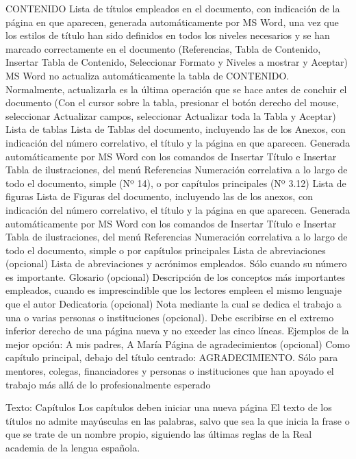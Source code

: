 CONTENIDO
Lista de títulos empleados en el documento, con indicación de la página en que aparecen,
generada automáticamente por MS Word, una vez que los estilos de título han sido definidos
en todos los niveles necesarios y se han marcado correctamente en el documento
(Referencias, Tabla de Contenido, Insertar Tabla de Contenido, Seleccionar Formato y
Niveles a mostrar y Aceptar)
MS Word no actualiza automáticamente la tabla de CONTENIDO. Normalmente,
actualizarla es la última operación que se hace antes de concluir el documento (Con el cursor
sobre la tabla, presionar el botón derecho del mouse, seleccionar Actualizar campos,
seleccionar Actualizar toda la Tabla y Aceptar)
Lista de tablas
Lista de Tablas del documento, incluyendo las de los Anexos, con indicación del número
correlativo, el título y la página en que aparecen.
Generada automáticamente por MS Word con los comandos de Insertar Título e Insertar
Tabla de ilustraciones, del menú Referencias
Numeración correlativa a lo largo de todo el documento, simple (Nº 14), o por capítulos
principales (Nº 3.12)
Lista de figuras
Lista de Figuras del documento, incluyendo las de los anexos, con indicación del número
correlativo, el título y la página en que aparecen.
Generada automáticamente por MS Word con los comandos de Insertar Título e Insertar
Tabla de ilustraciones, del menú Referencias
Numeración correlativa a lo largo de todo el documento, simple o por capítulos principales
Lista de
abreviaciones
(opcional)
Lista de abreviaciones y acrónimos empleados. Sólo cuando su número es importante.
Glosario (opcional) Descripción de los conceptos más importantes empleados, cuando es imprescindible que los
lectores empleen el mismo lenguaje que el autor
Dedicatoria
(opcional)
Nota mediante la cual se dedica el trabajo a una o varias personas o instituciones (opcional).
Debe escribirse en el extremo inferior derecho de una página nueva y no exceder las cinco
líneas. Ejemplos de la mejor opción: A mis padres, A María
Página de
agradecimientos
(opcional)
Como capítulo principal, debajo del título centrado: AGRADECIMIENTO. Sólo para
mentores, colegas, financiadores y personas o instituciones que han apoyado el trabajo más
allá de lo profesionalmente esperado


Texto: Capítulos
Los capítulos deben iniciar una nueva página
El texto de los títulos no admite mayúsculas en las palabras, salvo que sea la que
inicia la frase o que se trate de un nombre propio, siguiendo las últimas reglas de la
Real academia de la lengua española.




